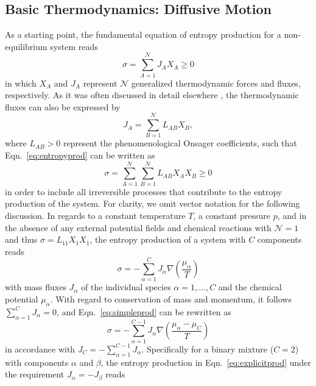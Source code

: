 \documentclass[aip,jcp,reprint]{revtex4-1}
\begin{document}
\subsection{Basic Thermodynamics: Diffusive Motion}
As a starting point, the fundamental equation of entropy production  for a non-equilibrium system reads
\begin{equation}
\label{eq:entropyprod}
\sigma=\sum_{A=1}^\mathcal{N} J_{A} X_{A}\geq 0
\end{equation}
in which $X_{A}$ and $J_A$ represent $\mathcal{N}$ generalized thermodynamic forces and fluxes, respectively. 
As it was often discussed  in detail elsewhere \cite{groot13a,lebon08a}, the thermodynamic fluxes can also be expressed
by
\begin{equation}
\label{eq:fundflux}
J_{A}=\sum_{B=1}^\mathcal{N} L_{AB} X_{B},
\end{equation}
where $L_{AB}>0$ represent the phenomenological Onsager coefficients, such that Eqn.~\eqref{eq:entropyprod} can be written as\cite{groot13a}
\begin{equation}
\label{eq:combflux}
\sigma=\sum_{A=1}^\mathcal{N} \sum_{B=1}^\mathcal{N} L_{AB} X_{A}X_{B}\geq 0
\end{equation}
in order to include all irreversible processes that contribute to the entropy production of the system. For clarity, we omit vector notation for the following discussion. In regards to a constant temperature $T$, a constant pressure $p$, and in the absence of any external potential fields and chemical reactions with $\mathcal{N}=1$ and thus $\sigma=L_{11}X_1X_1$, the entropy production of a system with $C$ components reads \cite{lebon08a}
\begin{equation}
\label{eq:simpleprod}
\sigma=-\sum_{\alpha=1}^C {J}_{\alpha} {\nabla}\left(\frac{\mu_{\alpha}}{T}\right)
\end{equation}
with mass fluxes ${J}_{\alpha}$ of the individual species \mbox{$\alpha=1,\ldots, C$} and the chemical potential $\mu_{\alpha}$. 
With regard to conservation of mass and momentum, it follows \mbox{$\sum_{\alpha=1}^C{J}_{\alpha}=0$}, and Eqn.~\eqref{eq:simpleprod} can be rewritten as
\begin{equation}
\label{eq:explicitprod}
\sigma=-\sum_{\alpha=1}^{C-1} {J}_{\alpha} {\nabla}\left(\frac{\mu_{\alpha}-\mu_C}{T}\right)
\end{equation}
in accordance with ${J}_C=-\sum_{\alpha=1}^{C-1}{J}_{\alpha}$.
Specifically for a binary mixture ($C=2$) with components $\alpha$ and $\beta$,  the entropy production in Eqn.~\eqref{eq:explicitprod} under the requirement  ${J}_{\alpha}=-{J}_{\beta}$ reads  
\end{document}
